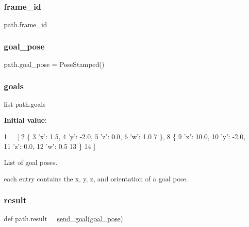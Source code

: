 \mbox{\label{namespacepath_a4cc7d1dff632eb836dcba3e28c989d10}} 
\subsubsection{\texorpdfstring{frame\+\_\+id}{frame\_id}}
{\footnotesize\ttfamily path.\+frame\+\_\+id}

\mbox{\label{namespacepath_a293cea0a504fa4dcccc4e27229ca89ae}} 
\subsubsection{\texorpdfstring{goal\+\_\+pose}{goal\_pose}}
{\footnotesize\ttfamily path.\+goal\+\_\+pose = Pose\+Stamped()}

\mbox{\label{namespacepath_a877836c262e905b21652b96e33c06fc5}} 
\subsubsection{\texorpdfstring{goals}{goals}}
{\footnotesize\ttfamily list path.\+goals}

{\bfseries Initial value\+:}
\begin{DoxyCode}
1 =  [
2         \{
3             \textcolor{stringliteral}{'x'}: 1.5,
4             \textcolor{stringliteral}{'y'}: -2.0,
5             \textcolor{stringliteral}{'z'}: 0.0,
6             \textcolor{stringliteral}{'w'}: 1.0
7         \},
8         \{
9             \textcolor{stringliteral}{'x'}: 10.0,
10             \textcolor{stringliteral}{'y'}: -2.0,
11             \textcolor{stringliteral}{'z'}: 0.0,
12             \textcolor{stringliteral}{'w'}: 0.5
13         \}
14     ]
\end{DoxyCode}


List of goal poses. 

each entry contains the x, y, z, and orientation of a goal pose. \mbox{\label{namespacepath_aefd1f3fdd2ce8dfc178f566e7ffbc0e6}} 
\subsubsection{\texorpdfstring{result}{result}}
{\footnotesize\ttfamily def path.\+result = \hyperlink{namespacepath_a2db4ca25204e9a7df7493344494d5a10}{send\+\_\+goal}(\hyperlink{namespacepath_a293cea0a504fa4dcccc4e27229ca89ae}{goal\+\_\+pose})}

